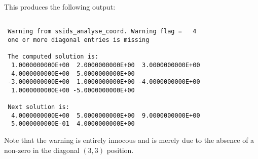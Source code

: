 \documentclass{spral}
\begin{document}
\noindent
This produces the following output:
\begin{verbatim}

 Warning from ssids_analyse_coord. Warning flag =   4
 one or more diagonal entries is missing

 The computed solution is:
  1.0000000000E+00  2.0000000000E+00  3.0000000000E+00
  4.0000000000E+00  5.0000000000E+00
 -3.0000000000E+00  1.0000000000E+00 -4.0000000000E+00
  1.0000000000E+00 -5.0000000000E+00

 Next solution is:
  4.0000000000E+00  5.0000000000E+00  9.0000000000E+00
  5.0000000000E-01  4.0000000000E+00
\end{verbatim}
Note that the warning is entirely innocous and is merely due to the absence of
a non-zero in the diagonal $(3,3)$ position.

\begin{funders}
\end{funders}
\end{document}
